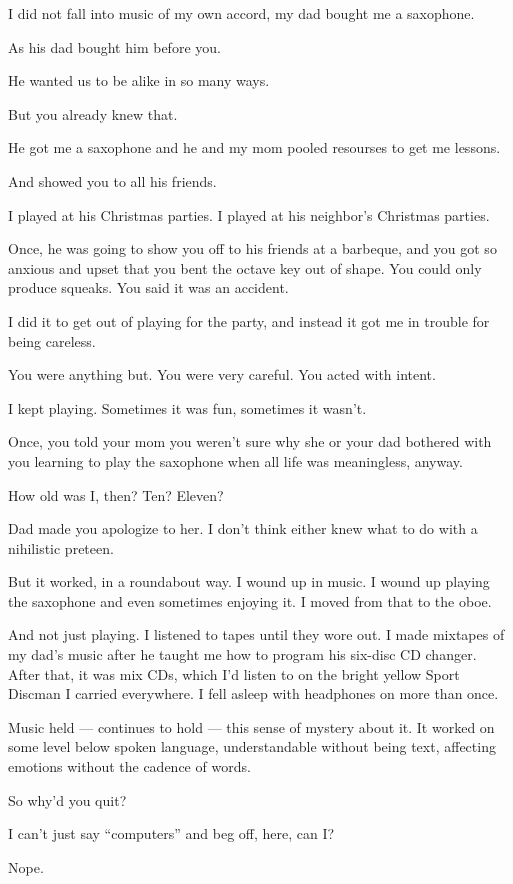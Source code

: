 \begin{leftcolumn}
  \noindent I did not fall into music of my own accord, my dad bought me a saxophone.

\begin{ally}
As his dad bought him before you.
\end{ally}
He wanted us to be alike in so many ways.

\begin{ally}
But you already knew that.
\end{ally}
He got me a saxophone and he and my mom pooled resourses to get me lessons.

\begin{ally}
And showed you to all his friends.
\end{ally}
I played at his Christmas parties. I played at his neighbor's Christmas parties.

\begin{ally}
Once, he was going to show you off to his friends at a barbeque, and you got so anxious and upset that you bent the octave key out of shape. You could only produce squeaks. You said it was an accident.
\end{ally}
I did it to get out of playing for the party, and instead it got me in trouble for being careless.

\begin{ally}
You were anything but. You were very careful. You acted with intent.
\end{ally}
I kept playing. Sometimes it was fun, sometimes it wasn't.

\begin{ally}
Once, you told your mom you weren't sure why she or your dad bothered with you learning to play the saxophone when all life was meaningless, anyway.
\end{ally}
How old was I, then? Ten? Eleven?

\begin{ally}
Dad made you apologize to her. I don't think either knew what to do with a nihilistic preteen.
\end{ally}
But it worked, in a roundabout way. I wound up in music. I wound up playing the saxophone and even sometimes enjoying it. I moved from that to the oboe.

And not just playing. I listened to tapes until they wore out. I made mixtapes of my dad's music after he taught me how to program his six-disc CD changer. After that, it was mix CDs, which I'd listen to on the bright yellow Sport Discman I carried everywhere. I fell asleep with headphones on more than once.

Music held --- continues to hold --- this sense of mystery about it. It worked on some level below spoken language, understandable without being text, affecting emotions without the cadence of words.

\begin{ally}
So why'd you quit?
\end{ally}
I can't just say ``computers'' and beg off, here, can I?

\begin{ally}
Nope.
\end{ally}
\newpage
\end{leftcolumn}
